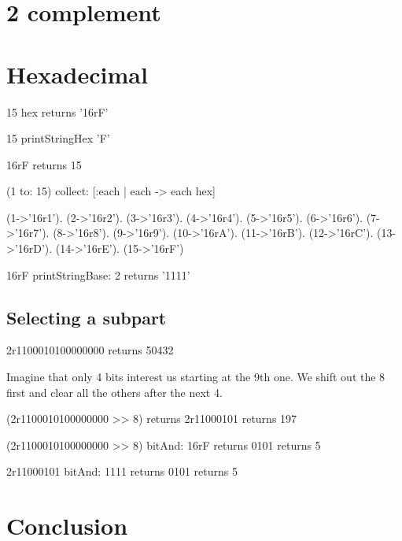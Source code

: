 \documentclass[a4paper,10pt,twoside]{book}
\begin{document}
\section{2 complement}


\section{Hexadecimal}


\begin{code}
15 hex
	returns '16rF'
	
15 printStringHex 'F'

16rF
	returns 15
\end{code}


\begin{code}
(1 to: 15) collect: [:each | each -> each hex] 

{(1->'16r1'). (2->'16r2'). (3->'16r3'). (4->'16r4'). (5->'16r5'). (6->'16r6'). (7->'16r7'). (8->'16r8'). (9->'16r9'). (10->'16rA'). (11->'16rB'). (12->'16rC'). (13->'16rD'). (14->'16rE'). (15->'16rF')}
\end{code}


\begin{code}{}
16rF printStringBase: 2
	returns '1111'
\end{code}


\subsection*{Selecting a subpart}

\begin{code}{}
2r1100010100000000 
	returns 50432
\end{code}

Imagine that only 4 bits interest us starting at the 9th one.
We shift out the 8 first and clear all the others after the next 4.  

\begin{code}{}
(2r1100010100000000 >> 8)
	returns 2r11000101
	returns 197

(2r1100010100000000 >> 8) bitAnd: 16rF	
	returns 0101	
	returns 5
	
2r11000101 bitAnd: 1111
	returns 0101	
	returns 5
\end{code}


\section{Conclusion}

\ifx\wholebook\relax\else
   
   
\end{document}
